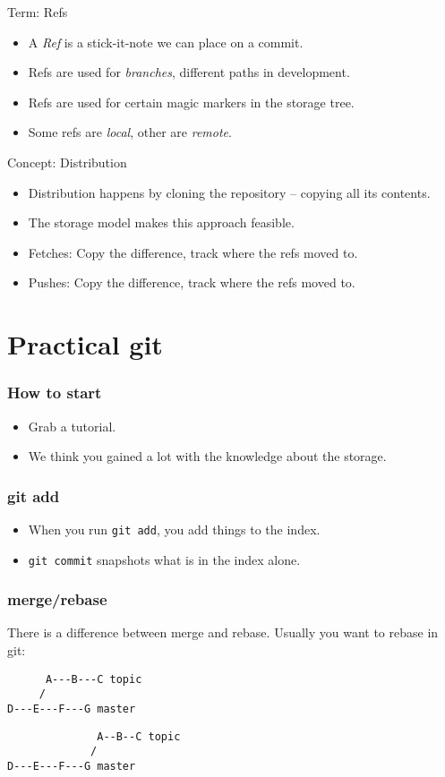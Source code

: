 \documentclass[xcolor=pdftex,dvipsnames]{beamer}
\begin{document}
\begin{frame}{Term: Refs}
  \begin{itemize}
  \item A \emph{Ref} is a stick-it-note we can place on a commit.
  \item Refs are used for \emph{branches}, different paths in development.
  \item Refs are used for certain magic markers in the storage tree.
  \item Some refs are \emph{local}, other are \emph{remote}.
  \end{itemize}
\end{frame}
\begin{frame}{Concept: Distribution}
  \begin{itemize}
  \item Distribution happens by cloning the repository -- copying all
    its contents.
  \item The storage model makes this approach feasible.
  \item Fetches: Copy the difference, track where the refs moved to.
  \item Pushes:  Copy the difference, track where the refs moved to.
  \end{itemize}
\end{frame}

\section{Practical git}
\begin{frame}
  \frametitle{How to start}
  \begin{itemize}
  \item Grab a tutorial.
  \item We think you gained a lot with the knowledge about the
    storage.
  \end{itemize}
\end{frame}

\begin{frame}
  \frametitle{git add}
  \begin{itemize}
  \item When you run \texttt{git add}, you add things to the index.
  \item \texttt{git commit} snapshots what is in the index alone.
  \end{itemize}
\end{frame}

\begin{frame}[fragile]
  \frametitle{merge/rebase}
  There is a difference between merge and rebase. Usually you want to
  rebase in git:
\begin{verbatim}
      A---B---C topic
     /
D---E---F---G master
\end{verbatim}
\begin{verbatim}
              A--B--C topic
             /
D---E---F---G master
 \end{verbatim}
\end{frame}
\end{document}
